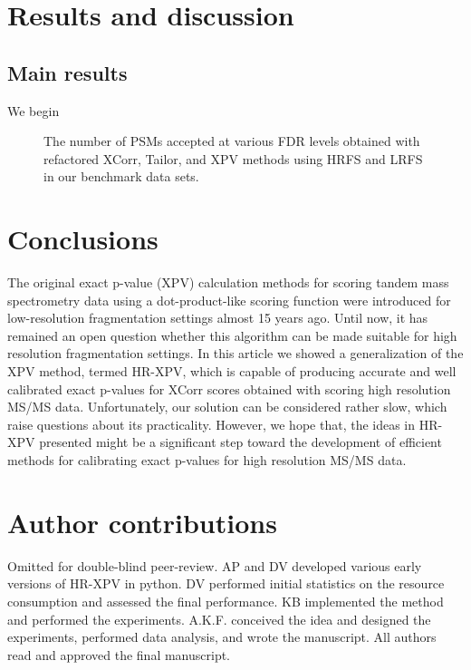 \documentclass{article}
\begin{document}
\section{Results and discussion}
\subsection{Main results}
We begin 
\begin{figure}[h]
   \centering
   \footnotesize
   \setlength{\tabcolsep}{0pt}	
\caption{The number of PSMs accepted at various FDR levels obtained with refactored XCorr, Tailor, and XPV methods using HRFS and LRFS in our benchmark data sets.}
\label{fg:hrxpv-perf}
\end{figure}

\section{Conclusions}
The original exact p-value (XPV) calculation methods for scoring tandem mass spectrometry data using a dot-product-like scoring function were introduced for low-resolution fragmentation settings almost 15 years ago. Until now, it has remained an open question whether this algorithm can be made suitable for high resolution fragmentation settings. In this article we showed a generalization of the XPV method, termed HR-XPV, which is capable of producing accurate and well calibrated exact p-values for XCorr scores obtained with scoring high resolution MS/MS data. Unfortunately, our solution can be considered rather slow, which raise questions about its practicality. However, we hope that, the ideas in HR-XPV presented might be a significant step toward the development of efficient methods for calibrating exact p-values for high resolution MS/MS data. 

\section*{Author contributions}
\ifdefined\DOUBLEBLINDREVIEW
Omitted for double-blind peer-review.
\else
AP and DV developed various early versions of HR-XPV in python. DV performed initial statistics on the resource consumption and assessed the final performance. KB implemented the method and performed the experiments. A.K.F. conceived the idea and designed the experiments, performed data analysis, and wrote the manuscript. All authors read and approved the final manuscript.
\fi
\end{document}
